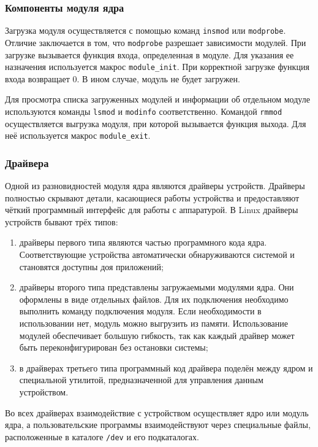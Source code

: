 \subsubsection{Компоненты модуля ядра}

Загрузка модуля осуществляется с помощью команд \texttt{insmod} или \texttt{modprobe}. Отличие заключается в том, что \texttt{modprobe} разрешает зависимости модулей. При загрузке вызывается функция входа, определенная в модуле. Для указания ее назначения используется макрос \texttt{module\_init}. При корректной загрузке функция входа возвращает 0. В ином случае, модуль не будет загружен.

Для просмотра списка загруженных модулей и информации об отдельном модуле используются команды \texttt{lsmod} и \texttt{modinfo} соответственно. Командой \texttt{rmmod} осуществляется выгрузка модуля, при которой вызывается функция выхода. Для неё используется макрос \texttt{module\_exit}.

\subsubsection{Драйвера}

Одной из разновидностей модуля ядра являются драйверы устройств. Драйверы полностью скрывают детали, касающиеся работы устройства и предоставляют чёткий программный интерфейс для работы с аппаратурой. В Linux драйверы устройств бывают трёх типов:

\begin{enumerate}
	\item драйверы первого типа являются частью программного кода ядра. Соответствующие устройства автоматически обнаруживаются системой и
	становятся доступны доя приложений;
	
	\item драйверы второго типа представлены загружаемыми модулями ядра. Они	оформлены в виде отдельных файлов. Для их подключения необходимо выполнить команду подключения модуля. Если необходимости в
	использовании нет, модуль можно выгрузить из памяти. Использование
	модулей обеспечивает большую гибкость, так как каждый драйвер может быть переконфигурирован без остановки системы;
	
	\item в драйверах третьего типа программный код драйвера поделён между ядром и специальной утилитой, предназначенной для управления данным устройством.
\end{enumerate}

Во всех драйверах взаимодействие с устройством осуществляет ядро или
модуль ядра, а пользовательские программы взаимодействуют через специальные файлы, расположенные в каталоге \texttt{/dev} и его подкаталогах.

